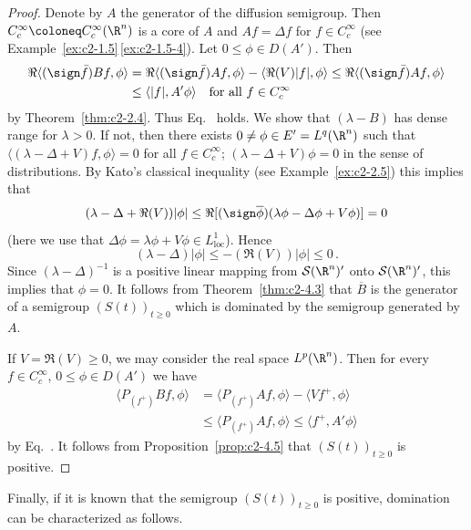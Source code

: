 \begin{proof}
Denote by $A$ the generator of the diffusion semigroup. 
Then $C^{\infty}_{c} \coloneq C^{\infty}_{c}(\R^{n})$ is a core of\/ $A$ and $Af = \Delta f$ for $f \in C^{\infty}_{c}$ (see Example~\ref{ex:c2-1.5}\,\ref{ex:c2-1.5-4}). 
Let $0 \leq \phi \in D(A')$. Then
\begin{align*}
\Re\langle(\sign \bar{f})Bf,\phi\rangle &= \Re\langle(\sign \bar{f})Af,\phi\rangle - \langle\Re(V)|f|,\phi\rangle \leq \Re\langle(\sign \bar{f})Af,\phi\rangle\\
&\leq \langle|f|,A'\phi\rangle \quad \text{for all } f \in C^{\infty}_{c} 
\end{align*}
by Theorem~\ref{thm:c2-2.4}.
Thus Eq.~ holds.
We show that $(\lambda - B)$ has dense range for $\lambda > 0$. 
If not, then there exists $0 \neq \phi \in E' = L^{q}(\R^{n})$ such that $\langle(\lambda - \Delta + V)f,\phi\rangle = 0$ for all $f \in C^{\infty}_{c}$; \ie $(\lambda - \Delta + V)\phi = 0$ in the sense of distributions. 
By Kato's classical inequality (see Example~\ref{ex:c2-2.5}) this implies that
\[
(\lambda - \Delta + \Re(V))|\phi| \leq \Re[(\sign \overline{\phi})(\lambda\phi - \Delta\phi + V\phi)] = 0
\] 
(here we use that $\Delta\phi = \lambda\phi + V\phi \in L^{1}_{\text{loc}}$). 
Hence 
\[
(\lambda - \Delta)|\phi| \leq -(\Re(V))|\phi| \leq 0\,.
\]
Since $(\lambda - \Delta)^{-1}$ is a positive linear mapping from $\mathcal{S}(\R^{n})'$ onto $\mathcal{S}(\R^{n})'$, this implies that $\phi = 0$. 
It follows from Theorem~\ref{thm:c2-4.3}   that $\overline{B}$ is the
generator of a semigroup $(S(t))_{t \geq 0}$ which is dominated by the semigroup generated by $A$.

If\/ $V = \Re(V) \geq 0$, we may consider the real space $L^{p}(\R^{n})$. 
Then for every $f \in C^{\infty}_{c}$, $0 \leq \phi \in D(A')$ we have
\begin{align*}
\langle P_{(f^{+})}Bf,\phi\rangle &= \langle P_{(f^{+})}Af,\phi\rangle - \langle Vf^{+},\phi\rangle\\
&\leq \langle P_{(f^{+})}Af,\phi\rangle 
\leq \langle f^{+},A'\phi\rangle
\end{align*}
by Eq.~. 
It follows from  Proposition~\ref{prop:c2-4.5} that $(S(t))_{t \geq 0}$ is positive.
\end{proof}
Finally, if it is known that the semigroup $(S(t))_{t \geq 0}$ is positive,
domination can be characterized as follows.
